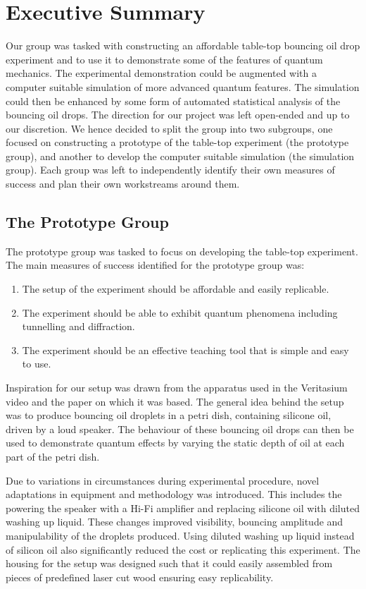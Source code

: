 \section*{Executive Summary}
Our group was tasked with constructing an affordable table-top bouncing oil drop experiment and to use it to demonstrate some of the features of quantum mechanics. The experimental demonstration could be augmented with a computer suitable simulation of more advanced quantum features. The simulation could then be enhanced by some form of automated statistical analysis of the bouncing oil drops. The direction for our project was left open-ended and up to our discretion. We hence decided to split the group into two subgroups, one focused on constructing a prototype of the table-top experiment (the prototype group), and another to develop the computer suitable simulation (the simulation group). Each group was left to independently identify their own measures of success and plan their own workstreams around them.

\subsection*{The Prototype Group}
The prototype group was tasked to focus on developing the table-top experiment. The main measures of success identified for the prototype group was:
\begin{enumerate}
    \item The setup of the experiment should be affordable and easily replicable.
\item The experiment should be able to exhibit quantum phenomena including tunnelling and diffraction.
\item The experiment should be an effective teaching tool that is simple and easy to use.
\end{enumerate}

Inspiration for our setup was drawn from the apparatus used in the Veritasium video \cite{Veritasium:2016} and the paper on which it was based. The general idea behind the setup was to produce bouncing oil droplets in a petri dish, containing silicone oil, driven by a loud speaker. The behaviour of these bouncing oil drops can then be used to demonstrate quantum effects by varying the static depth of oil at each part of the petri dish.

Due to variations in circumstances during experimental procedure, novel adaptations in equipment and methodology was introduced. This includes the powering the speaker with a Hi-Fi amplifier and replacing silicone oil with diluted washing up liquid. These changes improved visibility, bouncing amplitude and manipulability of the droplets produced. Using diluted washing up liquid instead of silicon oil also significantly reduced the cost or replicating this experiment. The housing for the setup was designed such that it could easily assembled from pieces of predefined laser cut wood ensuring easy replicability.  

